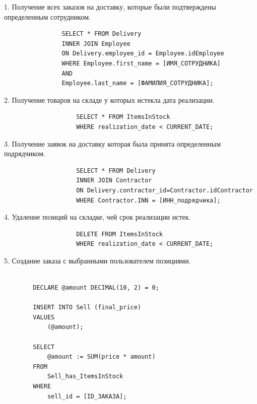 \documentclass[14pt]{extreport}
\begin{document}
    
        1. Получение всех заказов на доставку, которые были подтверждены определенным сотрудником.
            \begin{center}
                \begin{verbatim}
                SELECT * FROM Delivery
                INNER JOIN Employee
                ON Delivery.employee_id = Employee.idEmployee
                WHERE Employee.first_name = [ИМЯ_СОТРУДНИКА]
                AND
                Employee.last_name = [ФАМИЛИЯ_СОТРУДНИКА];
                \end{verbatim}
            \end{center}
        2. Получение товаров на складе у которых истекла дата реализации.
            \begin{center}
                \begin{verbatim}
                    SELECT * FROM ItemsInStock
                    WHERE realization_date < CURRENT_DATE;

                \end{verbatim}
            \end{center}
        
        3. Получение заявок на доставку которая была принята определенным подрядчиком.
            
                \begin{verbatim}
                    SELECT * FROM Delivery
                    INNER JOIN Contractor
                    ON Delivery.contractor_id=Contractor.idContractor
                    WHERE Contractor.INN = [ИНН_подрядчика];
                \end{verbatim}
            
        
        4. Удаление позиций на складке, чей срок реализации истек.
            \begin{center}
                \begin{verbatim}
                    DELETE FROM ItemsInStock
                    WHERE realization_date < CURRENT_DATE;
                \end{verbatim}
            \end{center}
        
        
        5. Создание заказа с выбранными пользователем позициями.

        \begin{verbatim}

        DECLARE @amount DECIMAL(10, 2) = 0;

        INSERT INTO Sell (final_price) 
        VALUES 
            (@amount);

        SELECT 
            @amount := SUM(price * amount) 
        FROM 
            Sell_has_ItemsInStock 
        WHERE 
            sell_id = [ID_ЗАКАЗА];

        \end{verbatim}
\end{document}
